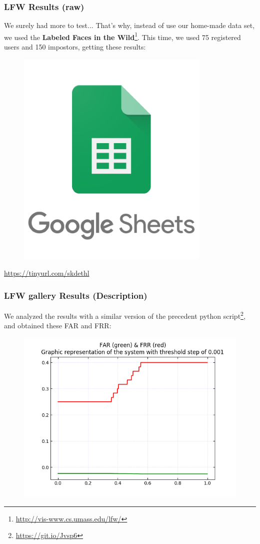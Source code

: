 \begin{frame} \frametitle{LFW Results (raw)}

	\vfill
	We surely had more to test... That's why, instead of use our home-made 
	data set, we used the \textbf{Labeled Faces in the Wild}\footnote{
	{\color{red} \url{http://vis-www.cs.umass.edu/lfw/}}}. This time, 
	we used 75 registered users and 150 impostors, getting these results:
	
	\begin{center}
		\begin{figure}[H]
			\includegraphics[width=.3\textwidth]{img/sheets}
		\end{figure}
		{\color{red} \url{https://tinyurl.com/skdethl}}	
	\end{center}
	\vfill

\end{frame}

\begin{frame} \frametitle{LFW gallery Results (Description)}

	We analyzed the results with a similar version of the precedent 
	python script\footnote{{\color{red} \url{https://git.io/Jvsp6}}}, 
	and obtained these FAR and FRR:
	
	\vfill
	\begin{center}
		\begin{figure}[H]
			\includegraphics[width=.7\textwidth]{img/far-frr-lfw}
		\end{figure}
	\end{center}
	\vfill

\end{frame}
